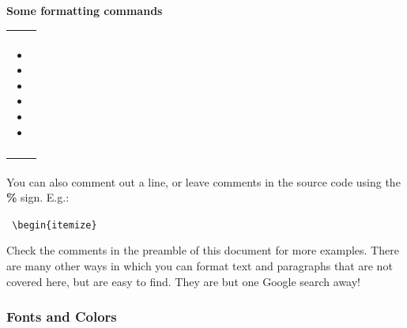 \documentclass{article} %
\newenvironment{boxedd}[1]
    {\begin{center}
    #1\\[1ex]
    \begin{tabular}{|p{1\textwidth}|}
    \hline\\
    }
    { 
    \\\\\hline
    \end{tabular} 
    \end{center}
    }
\begin{document}
\begin{boxedd}{\textbf{Some formatting commands}}
    \begin{itemize}
        \item[ ] \color{Green}{\verb+\raggedright+} \color{black}{for right alignment.}
        \item[ ] \color{Green}{\verb+\raggedleft+} \color{black}{for left alignment.}
        \item[ ] \color{Green}{\verb+\centering+} \color{black}{for centering.}
        \item[ ] \color{Green}{\verb+\indent+} \color{black}{to indent a paragraph that is not indented.}
        \item[ ] \color{Green}{\verb+\indent+} \color{black}{to create a non-indented paragraph.}
        \item[ ] \color{Green}{\verb+\doublespacing+} \color{black}{among other line spacing commands, from the package \color{Green}{\verb+\usepackage{+}\color{black}{setspace}\color{Green}{\verb+}+}}
    \end{itemize}
\end{boxedd}

\paragraph{}
You can also comment out a line, or leave comments in the source code using the \textbf{\%} sign. E.g.:

\begin{center}
 \verb+ \begin{itemize}+ {\color{azure}{\% This command line starts the itemize environment.}}   
\end{center}


\noindent Check the comments in the preamble of this document for more examples. 
\vspace{1em}
There are many other ways in which you can format text and paragraphs that are not covered here, but are easy to find. They are but one Google search away!
\subsubsection{Fonts and Colors}
\label{subsubsection:fontsandcolors}
\end{document}
